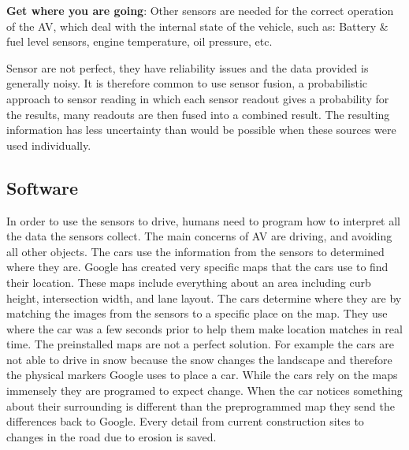 \documentclass[11pt]{article}
\begin{document}
\textbf{Get where you are going}:
		Other sensors are needed for the correct operation of the AV, which deal with the internal state of the vehicle, such as: Battery \& fuel level sensors, engine temperature, oil pressure, etc.

Sensor are not perfect, they have reliability issues and the data provided is generally noisy. It is therefore common to use sensor fusion, a probabilistic approach to sensor reading in which each sensor readout gives a probability for the results, many readouts are then fused into a combined result. The resulting information has less uncertainty than would be possible when these sources were used individually.\cite{HellstromUmea}

\subsection{Software}
In order to use the sensors to drive, humans need to program how to interpret all the data the sensors collect. The main concerns of AV are driving, and avoiding all other objects. The cars use the information from the sensors to determined where they are. Google has created very specific maps that the cars use to find their location. These maps include everything about an area including curb height, intersection width, and lane layout. \cite{chrisurmson2016}
The cars determine where they are by matching the images from the sensors to
a specific place on the map. They use where the car was a few seconds prior to help them make location matches in real
time. The preinstalled maps are not a perfect solution. For example the
cars are not able to drive in snow because the snow changes the landscape and therefore the physical markers Google
uses to place a car.\cite{chrisurmson2016} While the cars rely on the maps immensely they are programed to expect change. When the car notices something about their surrounding is
different than the preprogrammed map they send the differences back to Google. Every detail from current construction sites to changes in the road due to erosion
is saved. \cite{chrisurmson2016}
\end{document}
